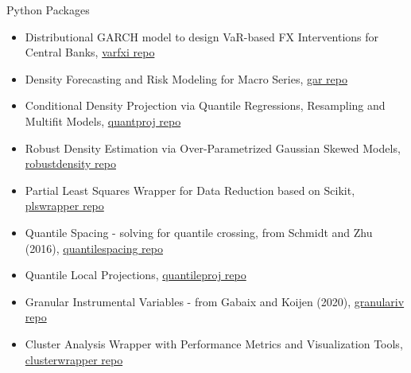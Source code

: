 \documentclass[usegeometry, 10pt, a4paper]{cv} %
\begin{document}
\begin{rubriquetableau}[0.95\textwidth]{Python Packages}\\
  \vspace{-0.8cm}
  
\begin{itemize}
\item Distributional GARCH model to design VaR-based FX Interventions for Central Banks, \href{https://github.com/romainlafarguette/varfxi}{varfxi repo} 
\item Density Forecasting and Risk Modeling for Macro Series, \href{https://github.com/IMFGAR/GaR}{gar repo}
\item Conditional Density Projection via Quantile Regressions, Resampling and Multifit Models, \href{https://github.com/romainlafarguette/gar}{quantproj repo}
\item Robust Density Estimation via Over-Parametrized Gaussian Skewed Models, \href{https://github.com/romainlafarguette/robustdensity}{robustdensity repo}
\item Partial Least Squares Wrapper for Data Reduction based on Scikit, \href{https://github.com/romainlafarguette/plswrapper}{plswrapper repo}
\item Quantile Spacing - solving for quantile crossing, from Schmidt and Zhu (2016), \href{https://github.com/romainlafarguette/quantilespacing}{quantilespacing repo}
\item Quantile Local Projections, \href{https://github.com/romainlafarguette/quantileproj}{quantileproj repo}
\item Granular Instrumental Variables - from Gabaix and Koijen (2020), \href{https://github.com/romainlafarguette/granulariv}{granulariv repo}
\item Cluster Analysis Wrapper with Performance Metrics and Visualization Tools, \href{https://github.com/romainlafarguette/clusterwrapper}{clusterwrapper repo}
\end{itemize}  

\end{rubriquetableau}

\end{document}
